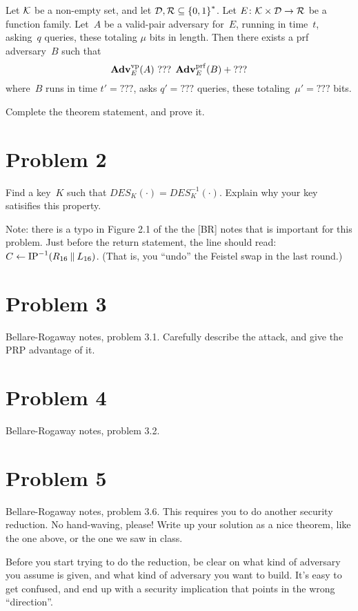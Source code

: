 \documentclass[11pt]{article}
\newcommand{\AdvPRF}[2]{\Adv^{\mathrm{prf}}_{#1}(#2)}
\newcommand{\AdvVP}[2]{\Adv^{\mathrm{vp}}_{#1}(#2)}
\begin{document}
\begin{theorem}
Let ${\cal K}$ be a non-empty set, and let ${\cal D},{\cal R} \subseteq
{\{0,1\}}^*$. Let $E \colon {\cal K} \times {\cal D} \to
{\cal R}$ be a function family.  Let~$A$ be a valid-pair adversary
for~$E$, running in time~$t$, asking~$q$ queries, these totaling
$\mu$ bits in length.  Then there exists a prf adversary~$B$ such
that
\[
\AdvVP{E}{A} \mbox{ ??? } \AdvPRF{E}{B} + \mbox{???}
\]
where~$B$ runs in time $t'= \mbox{???} $, asks $q'= \mbox{???} $ queries, these
totaling~$\mu'= \mbox{???} $ bits.
\end{theorem}

Complete the theorem statement, and prove it.

\section*{Problem 2}
Find a key~$K$ such that $DES_K(\cdot)=DES^{-1}_K(\cdot)$.  Explain
why your key satisifies this property.

\noindent
Note: there is a typo in Figure 2.1 of the the [BR] notes that is
important for this problem.  Just before the return statement, the
line should read: $C \gets \mathrm{IP}^{-1}(R_{16} \:\|\: L_{16})$.
(That is, you ``undo'' the Feistel swap in the last round.)


\section*{Problem 3}
Bellare-Rogaway notes, problem 3.1.  Carefully describe the attack,
and give the PRP advantage of it.

\section*{Problem 4}
Bellare-Rogaway notes, problem 3.2.

\section*{Problem 5}
Bellare-Rogaway notes, problem 3.6.  This requires you to do another
security reduction.  No hand-waving, please!  Write up your solution
as a nice theorem, like the one above, or the one we saw in class.

Before you start trying to do the reduction, be clear on what kind of
adversary you assume is given, and what kind of adversary you want to build.  It's
easy to get confused, and end up with a security implication that
points in the wrong ``direction''.
\end{document}
